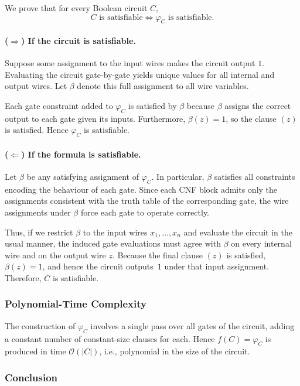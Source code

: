 \documentclass[9pt]{extarticle}
\begin{document}
We prove that for every Boolean circuit $C$,
\[
    C \text{ is satisfiable} \iff \varphi_C \text{ is satisfiable}.
\]

\paragraph{($\Rightarrow$) If the circuit is satisfiable.}

Suppose some assignment to the input wires makes the circuit output $1$.
Evaluating the circuit gate-by-gate yields unique values for all internal and
output wires.  Let $\beta$ denote this full assignment to all wire variables.

Each gate constraint added to $\varphi_C$ is satisfied by $\beta$ because
$\beta$ assigns the correct output to each gate given its inputs.  Furthermore,
$\beta(z)=1$, so the clause $(z)$ is satisfied.  Hence $\varphi_C$ is satisfiable.

\paragraph{($\Leftarrow$) If the formula is satisfiable.}

Let $\beta$ be any satisfying assignment of $\varphi_C$.  In particular,
$\beta$ satisfies all constraints encoding the behaviour of each gate.  Since
each CNF block admits only the assignments consistent with the truth table of
the corresponding gate, the wire assignments under $\beta$ force each gate to
operate correctly.

Thus, if we restrict $\beta$ to the input wires $x_1,\dots,x_n$ and evaluate the
circuit in the usual manner, the induced gate evaluations must agree with
$\beta$ on every internal wire and on the output wire $z$.  Because the final
clause $(z)$ is satisfied, $\beta(z)=1$, and hence the circuit outputs~$1$ under
that input assignment.  Therefore, $C$ is satisfiable.

\subsubsection*{Polynomial-Time Complexity}

The construction of $\varphi_C$ involves a single pass over all gates of the
circuit, adding a constant number of constant-size clauses for each.  Hence
$f(C)=\varphi_C$ is produced in time $\mathcal{O}(|C|)$, i.e., polynomial in the
size of the circuit.

\subsubsection*{Conclusion}
\end{document}
